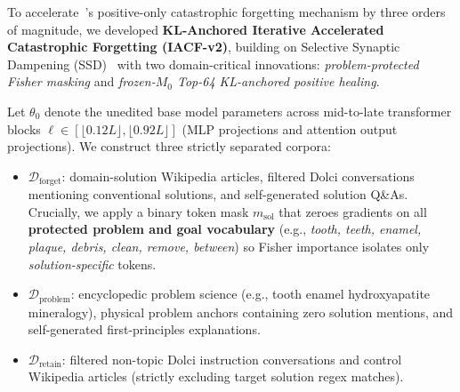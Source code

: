 \documentclass[10.5pt,letterpaper]{article}
\begin{document}
To accelerate~\cite{dambrosio2026value}'s positive-only catastrophic forgetting mechanism by three orders of magnitude, we developed \textbf{KL-Anchored Iterative Accelerated Catastrophic Forgetting (IACF-v2)}, building on Selective Synaptic Dampening (SSD)~\cite{foster2024ssd} with two domain-critical innovations: \emph{problem-protected Fisher masking} and \emph{frozen-$M_0$ Top-64 KL-anchored positive healing}.

Let $\theta_0$ denote the unedited base model parameters across mid-to-late transformer blocks $\ell \in [\lfloor 0.12L\rfloor, \lfloor 0.92L\rfloor]$ (MLP projections and attention output projections). We construct three strictly separated corpora:
\begin{itemize}
  \item $\mathcal{D}_{\text{forget}}$: domain-solution Wikipedia articles, filtered Dolci conversations mentioning conventional solutions, and self-generated solution Q\&As. Crucially, we apply a binary token mask $m_{\text{sol}}$ that zeroes gradients on all \textbf{protected problem and goal vocabulary} (e.g., \emph{tooth, teeth, enamel, plaque, debris, clean, remove, between}) so Fisher importance isolates only \emph{solution-specific} tokens.
  \item $\mathcal{D}_{\text{problem}}$: encyclopedic problem science (e.g., tooth enamel hydroxyapatite mineralogy), physical problem anchors containing zero solution mentions, and self-generated first-principles explanations.
  \item $\mathcal{D}_{\text{retain}}$: filtered non-topic Dolci instruction conversations and control Wikipedia articles (strictly excluding target solution regex matches).
\end{itemize}
\end{document}
